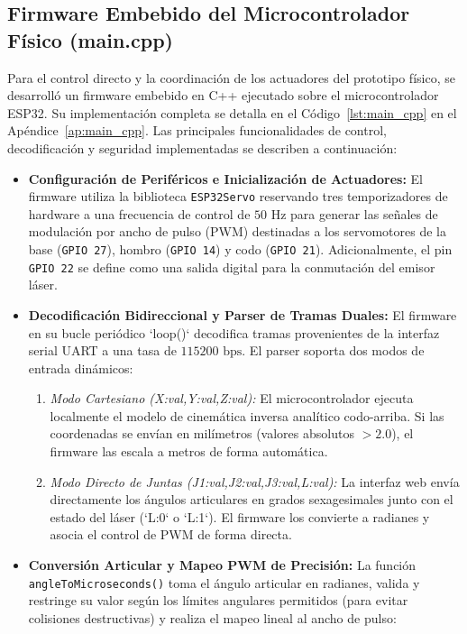 \documentclass[conference,a4paper]{IEEEtran}
\begin{document}
\subsection{Firmware Embebido del Microcontrolador Físico (main.cpp)}
Para el control directo y la coordinación de los actuadores del prototipo físico, se desarrolló un firmware embebido en C++ ejecutado sobre el microcontrolador ESP32. Su implementación completa se detalla en el Código~\ref{lst:main_cpp} en el Apéndice~\ref{ap:main_cpp}. Las principales funcionalidades de control, decodificación y seguridad implementadas se describen a continuación:
\begin{itemize}
    \item \textbf{Configuración de Periféricos e Inicialización de Actuadores:} El firmware utiliza la biblioteca \texttt{ESP32Servo} reservando tres temporizadores de hardware a una frecuencia de control de $50\text{ Hz}$ para generar las señales de modulación por ancho de pulso (PWM) destinadas a los servomotores de la base (\texttt{GPIO 27}), hombro (\texttt{GPIO 14}) y codo (\texttt{GPIO 21}). Adicionalmente, el pin \texttt{GPIO 22} se define como una salida digital para la conmutación del emisor láser.
    \item \textbf{Decodificación Bidireccional y Parser de Tramas Duales:} El firmware en su bucle periódico `loop()` decodifica tramas provenientes de la interfaz serial UART a una tasa de $115200\text{ bps}$. El parser soporta dos modos de entrada dinámicos:
        \begin{enumerate}
            \item \textit{Modo Cartesiano (X:val,Y:val,Z:val):} El microcontrolador ejecuta localmente el modelo de cinemática inversa analítico codo-arriba. Si las coordenadas se envían en milímetros (valores absolutos $> 2.0$), el firmware las escala a metros de forma automática.
            \item \textit{Modo Directo de Juntas (J1:val,J2:val,J3:val,L:val):} La interfaz web envía directamente los ángulos articulares en grados sexagesimales junto con el estado del láser (`L:0` o `L:1`). El firmware los convierte a radianes y asocia el control de PWM de forma directa.
        \end{enumerate}
    \item \textbf{Conversión Articular y Mapeo PWM de Precisión:} La función \texttt{angleToMicroseconds()} toma el ángulo articular en radianes, valida y restringe su valor según los límites angulares permitidos (para evitar colisiones destructivas) y realiza el mapeo lineal al ancho de pulso:

\end{itemize}
\end{document}
